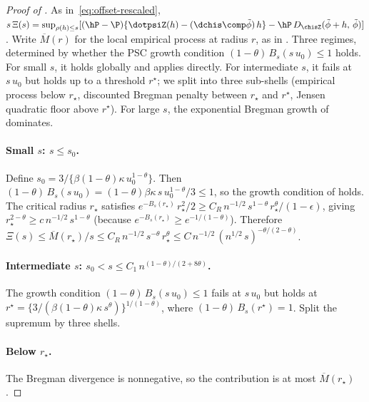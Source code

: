 \documentclass{article}
\begin{document}
\begin{proof}[Proof of ]
As in~\eqref{eq:offset-rescaled},
$s\,\Xi(s) = \sup_{\rho(h) \le s}
  [(\hP - \P)\{\dotpsiZ(h) - (\dchis \comp \tilde\phi)\, h\}
    - \hP\, D_{\chisZ}(\tilde\phi + h,\, \tilde\phi)]$.
Write $\overline{M}(r)$ for the local empirical process
at radius $r$, as in .
Three regimes, determined by whether
the PSC growth condition
$(1-\theta)\, B_s(s\, u_0) \le 1$ holds.
For small $s$, it holds globally
and  applies directly.
For intermediate $s$, it fails at $s\, u_0$
but holds up to a threshold $r^\star$;
we split into three sub-shells
(empirical process below $r_\star$,
discounted Bregman penalty between $r_\star$ and $r^\star$,
Jensen quadratic floor above $r^\star$).
For large $s$,
the exponential Bregman growth of 
dominates.

\paragraph{Small $s$: $s \le s_0$.}
Define $s_0 = 3/\{\beta(1-\theta)\kappa\, u_0^{1-\theta}\}$.
Then $(1-\theta)\, B_s(s\, u_0)
  = (1-\theta)\beta\kappa\, s\, u_0^{1-\theta}/3 \le 1$,
so the growth condition
of  holds.
The critical radius $r_\star$ satisfies
$e^{-B_s(r_\star)}\, r_\star^2/2
  \ge C_R\, n^{-1/2}\, s^{1-\theta}\, r_\star^\theta / (1-\epsilon)$,
giving $r_\star^{2-\theta}
  \ge c\, n^{-1/2}\, s^{1-\theta}$
(because $e^{-B_s(r_\star)} \ge e^{-1/(1-\theta)}$).
Therefore
$\Xi(s) \le \overline{M}(r_\star)/s
  \le C_R\, n^{-1/2}\, s^{-\theta}\, r_\star^\theta
  \le C\, n^{-1/2}\, (n^{1/2}\, s)^{-\theta/(2-\theta)}$.

\paragraph{Intermediate $s$:
  $s_0 < s \le C_1\, n^{(1-\theta)/(2+8\theta)}$.}
The growth condition $(1-\theta)\, B_s(s\, u_0) \le 1$
fails at $s\, u_0$ but holds at
$r^\star
  = \{3/(\beta(1-\theta)\kappa\, s^\theta)\}^{1/(1-\theta)}$,
where $(1-\theta)\, B_s(r^\star) = 1$.
Split the supremum by three shells.

\paragraph{Below $r_\star$.}
The Bregman divergence is nonnegative,
so the contribution is at most $\overline{M}(r_\star)$.


\end{proof}
\end{document}

